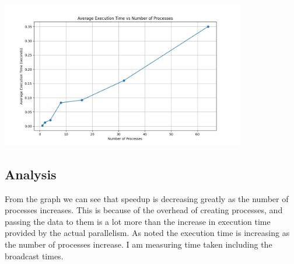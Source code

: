 \documentclass[12pt]{article}
\begin{document}
\begin{center}
    \includegraphics[width=0.8\textwidth]{avg_execution_time_vs_processes.png}
    \label{fig:execution_time_processes}
\end{center}

\subsection*{Analysis}
From the graph we can see that speedup is decreasing greatly as the number of processes increases. This is because of the overhead of creating processes, and passing the data to them is a lot more than the increase in execution time provided by the actual parallelism. As noted the execution time is increasing as the number of processes increase. I am measuring time taken including the broadcast times.
\end{document}
